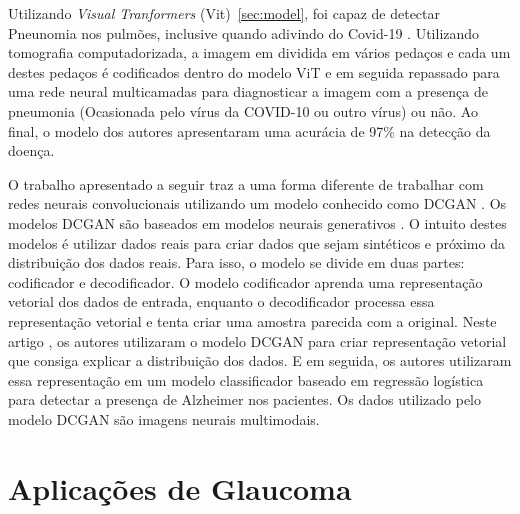\documentclass[ %
	msc, %
	portugues %
]{../ppgccufmg}
\begin{document}
    Utilizando \textit{Visual Tranformers} (Vit)~\ref{sec:model}, foi capaz de detectar Pneunomia nos
    pulmões, inclusive quando adivindo do Covid-19 \citep{sbcas}.
    Utilizando tomografia computadorizada, a imagem em dividida em vários pedaços e cada um destes pedaços é codificados
    dentro do modelo ViT e em seguida repassado para uma rede neural multicamadas para diagnosticar
    a imagem com a presença de pneumonia (Ocasionada pelo vírus da COVID-10 ou outro vírus) ou não.
    Ao final, o modelo dos autores apresentaram uma acurácia de 97\% na detecção da doença.

    O trabalho apresentado a seguir traz a uma forma diferente de trabalhar com redes neurais convolucionais
    utilizando um modelo conhecido como DCGAN \citep{Bian2019}. Os modelos DCGAN são baseados em
    modelos neurais generativos \citep{GoodBengCour16, gan}. O intuito destes modelos é utilizar
    dados reais para criar dados que sejam sintéticos e próximo da distribuição dos dados reais.
    Para isso, o modelo se divide em duas partes: codificador e decodificador. O modelo codificador
    aprenda uma representação vetorial dos dados de entrada, enquanto o decodificador processa essa
    representação vetorial e tenta criar uma amostra parecida com a original. Neste artigo \citep{Bian2019}, os
    autores utilizaram o modelo DCGAN para criar representação vetorial que consiga
    explicar a distribuição dos dados. E em seguida, os autores utilizaram essa representação
    em um modelo classificador baseado em regressão logística para detectar a presença de Alzheimer
    nos pacientes. Os dados utilizado pelo modelo DCGAN são imagens neurais multimodais.


    \section{Aplicações de Glaucoma}
\end{document}
